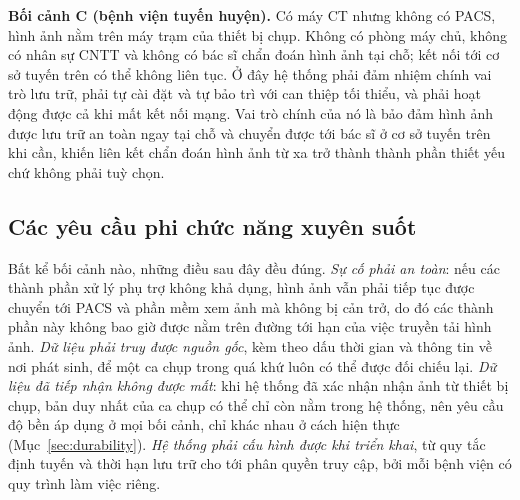 \textbf{Bối cảnh C (bệnh viện tuyến huyện).} Có máy CT nhưng không có PACS,
hình ảnh nằm trên máy trạm của thiết bị chụp. Không có phòng máy chủ, không có
nhân sự CNTT và không có bác sĩ chẩn đoán hình ảnh tại chỗ; kết nối tới cơ sở
tuyến trên có thể không liên tục. Ở đây hệ thống phải đảm nhiệm chính vai trò
lưu trữ, phải tự cài đặt và tự bảo trì với can thiệp tối thiểu, và phải hoạt
động được cả khi mất kết nối mạng. Vai trò chính của nó là bảo đảm hình ảnh
được lưu trữ an toàn ngay tại chỗ và chuyển được tới bác sĩ ở cơ sở tuyến trên
khi cần, khiến liên kết chẩn đoán hình ảnh từ xa trở thành thành phần thiết yếu
chứ không phải tuỳ chọn.

\subsection{Các yêu cầu phi chức năng xuyên suốt}

Bất kể bối cảnh nào, những điều sau đây đều đúng. \emph{Sự cố phải an toàn}:
nếu các thành phần xử lý phụ trợ không khả dụng, hình ảnh vẫn phải tiếp tục
được chuyển tới PACS và phần mềm xem ảnh mà không bị cản trở, do đó các thành
phần này không bao giờ được nằm trên đường tới hạn của việc truyền tải hình
ảnh. \emph{Dữ liệu phải truy được nguồn gốc}, kèm theo dấu thời gian và thông
tin về nơi phát sinh, để một ca chụp trong quá khứ luôn có thể được đối chiếu
lại. \emph{Dữ liệu đã tiếp nhận không được mất}: khi hệ thống đã xác nhận nhận ảnh từ
thiết bị chụp, bản duy nhất của ca chụp có thể chỉ còn nằm trong hệ thống, nên yêu
cầu độ bền áp dụng ở mọi bối cảnh, chỉ khác nhau ở cách hiện thực
(Mục~\ref{sec:durability}). \emph{Hệ thống phải cấu hình được khi triển khai}, từ quy tắc định tuyến
và thời hạn lưu trữ cho tới phân quyền truy cập, bởi mỗi bệnh viện có quy trình
làm việc riêng.
